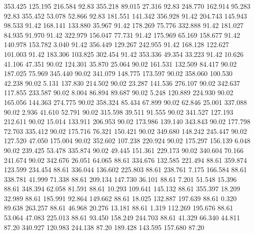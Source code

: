  353.425  125.195  216.584        92.83
 355.218   89.015   27.316        92.83
 248.770  162.914   95.283        92.83
 355.452   53.078   52.866        92.83
 181.551  141.342  356.928        91.42
 204.743  145.943   98.533        91.42
 168.141  133.880   35.967        91.42
 178.269   75.776  332.888        91.42
 181.027   84.935   91.970        91.42
 322.979  156.047   77.731        91.42
 175.969   65.169  158.677        91.42
 140.978  153.782    3.040        91.42
 356.449  129.267  242.955        91.42
 168.128  122.627  101.003        91.42
 183.306  103.825  302.454        91.42
 353.336   49.354   33.223        91.42
  10.626   41.106   47.351        90.02
 124.301   35.870   25.064        90.02
 161.531  132.509   84.417        90.02
 187.025   75.969  345.440        90.02
 341.079  148.775  173.597        90.02
 358.060  100.530   42.238        90.02
   5.131  137.830  214.502        90.02
  23.287  141.536  276.107        90.02
 342.637  117.855  233.587        90.02
   8.004   86.894   89.687        90.02
   5.248  120.889  224.930        90.02
 165.056  144.363  274.775        90.02
 358.324   85.434   67.899        90.02
  62.846   25.001  337.088        90.02
   2.936   41.610   52.791        90.02
 315.598   39.511   91.555        90.02
 341.527  127.193  212.611        90.02
  15.014  133.911  206.953        90.02
 173.986  139.140  343.843        90.02
 177.798   72.703  335.412        90.02
 175.716   76.321  150.421        90.02
 349.680  148.242  245.447        90.02
 127.520   47.050  175.004        90.02
 352.602  107.238  220.924        90.02
 175.297  156.139    6.048        90.02
 239.425   53.478  335.874        90.02
  49.445  151.361  229.173        90.02
 340.604   70.166  241.674        90.02
 342.676   26.051   64.065        88.61
 334.676  132.585  221.494        88.61
 359.874  123.599  234.454        88.61
 336.044  136.602  225.803        88.61
 238.761    7.175  166.584        88.61
 338.781   41.999   71.338        88.61
 209.134  147.730   36.101        88.61
   7.201   51.548   15.396        88.61
 348.394   62.058   81.591        88.61
  10.293  109.641  145.132        88.61
 355.397   18.209   32.989        88.61
 185.991   92.864  149.662        88.61
  18.025  132.887  197.639        88.61
   0.320   89.638  263.257        88.61
  46.968   20.276   13.181        88.61
   1.319  112.269  195.676        88.61
  53.064   47.083  225.013        88.61
  93.450  158.249  244.703        88.61
  41.329   66.340   44.811        87.20
 340.927  120.983  244.138        87.20
 189.428  143.595  157.680        87.20
